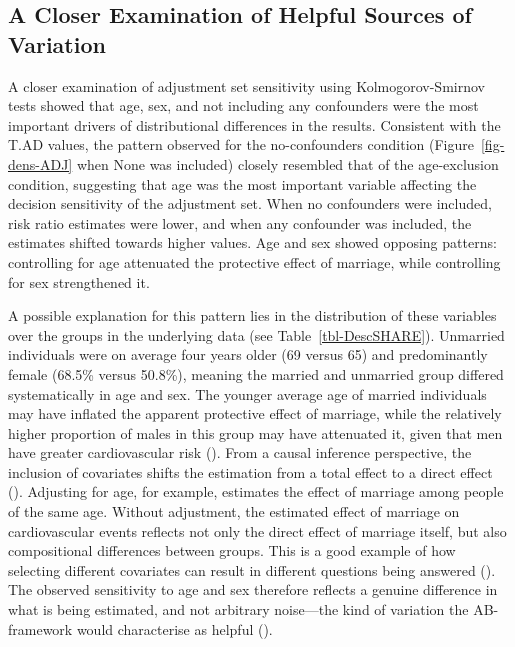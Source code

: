 \documentclass[
  man,
  floatsintext,
  longtable,
  nolmodern,
  notxfonts,
  notimes,
  colorlinks=true,linkcolor=blue,citecolor=blue,urlcolor=blue]{apa7}
\begin{document}
\subsection{A Closer Examination of Helpful Sources of
Variation}\label{a-closer-examination-of-helpful-sources-of-variation}

A closer examination of adjustment set sensitivity using
Kolmogorov-Smirnov tests showed that age, sex, and not including any
confounders were the most important drivers of distributional
differences in the results. Consistent with the T.AD values, the pattern
observed for the no-confounders condition (Figure~\ref{fig-dens-ADJ}
when None was included) closely resembled that of the age-exclusion
condition, suggesting that age was the most important variable affecting
the decision sensitivity of the adjustment set. When no confounders were
included, risk ratio estimates were lower, and when any confounder was
included, the estimates shifted towards higher values. Age and sex
showed opposing patterns: controlling for age attenuated the protective
effect of marriage, while controlling for sex strengthened it.

A possible explanation for this pattern lies in the distribution of
these variables over the groups in the underlying data (see
Table~\ref{tbl-DescSHARE}). Unmarried individuals were on average four
years older (69 versus 65) and predominantly female (68.5\% versus
50.8\%), meaning the married and unmarried group differed systematically
in age and sex. The younger average age of married individuals may have
inflated the apparent protective effect of marriage, while the
relatively higher proportion of males in this group may have attenuated
it, given that men have greater cardiovascular risk
(). From a
causal inference perspective, the inclusion of covariates shifts the
estimation from a total effect to a direct effect
(). Adjusting for age,
for example, estimates the effect of marriage among people of the same
age. Without adjustment, the estimated effect of marriage on
cardiovascular events reflects not only the direct effect of marriage
itself, but also compositional differences between groups. This is a
good example of how selecting different covariates can result in
different questions being answered
().
The observed sensitivity to age and sex therefore reflects a genuine
difference in what is being estimated, and not arbitrary noise---the
kind of variation the AB-framework would characterise as helpful
().
\end{document}
